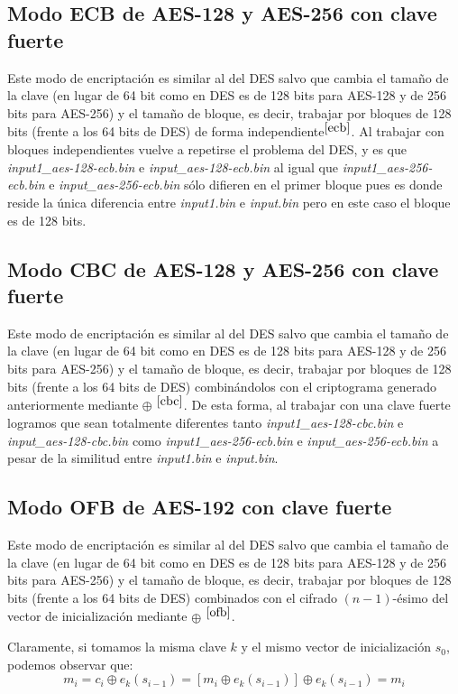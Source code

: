 \documentclass[a4paper, 11pt]{article}
\begin{document}
	\subsection{Modo ECB de AES-128 y AES-256 con clave fuerte}\label{AES-ECB}
		Este modo de encriptación es similar al del DES salvo que cambia el tamaño de la clave (en lugar de 64 bit como en
		DES es de 128 bits para AES-128 y de 256 bits para AES-256) y el tamaño de bloque, es decir, trabajar por bloques
		de 128 bits (frente a los 64 bits de DES) de forma independiente$^{\ref{ecb}}$. Al trabajar con bloques independientes
		vuelve a repetirse el problema del DES, y es que \textit{input1\_aes-128-ecb.bin} e \textit{input\_aes-128-ecb.bin}
		al igual que \textit{input1\_aes-256-ecb.bin} e \textit{input\_aes-256-ecb.bin} sólo difieren en el primer bloque
		pues es donde reside la única diferencia entre \textit{input1.bin} e \textit{input.bin} pero en este caso el bloque
		es de 128 bits.
		
	\subsection{Modo CBC de AES-128 y AES-256 con clave fuerte}\label{AES-CBC}
		Este modo de encriptación es similar al del DES salvo que cambia el tamaño de la clave (en lugar de 64 bit como en
		DES es de 128 bits para AES-128 y de 256 bits para AES-256) y el tamaño de bloque, es decir, trabajar por bloques
		de 128 bits (frente a los 64 bits de DES) combinándolos con el criptograma generado anteriormente mediante $\oplus$
		$^{\ref{cbc}}$. De esta forma, al trabajar con una clave fuerte logramos que sean totalmente diferentes tanto
		\textit{input1\_aes-128-cbc.bin} e \textit{input\_aes-128-cbc.bin} como \textit{input1\_aes-256-ecb.bin} e
		\textit{input\_aes-256-ecb.bin} a pesar de la similitud entre \textit{input1.bin} e \textit{input.bin}.
		
	\subsection{Modo OFB de AES-192 con clave fuerte}
		Este modo de encriptación es similar al del DES salvo que cambia el tamaño de la clave (en lugar de 64 bit como en
		DES es de 128 bits para AES-128 y de 256 bits para AES-256) y el tamaño de bloque, es decir, trabajar por bloques
		de 128 bits (frente a los 64 bits de DES) combinados con el cifrado $(n-1)$-ésimo del vector de inicialización
		mediante $\oplus$ $^{\ref{ofb}}$.
		
		Claramente, si tomamos la misma clave $k$ y el mismo vector de inicialización $s_0$, podemos observar que:
		\[m_i = c_i \oplus e_k(s_{i-1}) = [m_i \oplus e_k(s_{i-1})] \oplus e_k(s_{i-1}) = m_i\]
		
\end{document}
